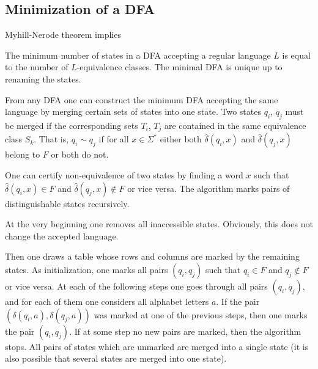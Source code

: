 \begin{page}

\subsection{Minimization of a DFA}
Myhill-Nerode theorem implies


\end{page}

\begin{page}

\begin{cor}
The minimum number of states in a DFA accepting a regular language $L$ is equal to the number of $L$-equivalence classes.
The minimal DFA is unique up to renaming the states.
\end{cor}

\end{page}

\begin{page}



From any DFA one can construct the minimum DFA accepting the same language by merging certain sets of states into one state.
Two states $q_i$, $q_j$ must be merged if the corresponding sets $T_i$, $T_j$ are contained in the same equivalence class $S_k$.
That is, $q_i \sim q_j$ if for all $x \in \Sigma^*$ either both $\widehat{\delta}(q_i, x)$ and $\widehat{\delta}(q_j, x)$ belong to $F$ or both do not.

One can certify non-equivalence of two states by finding a word $x$ such that $\widehat{\delta}(q_i, x) \in F$ and $\widehat{\delta}(q_j, x) \notin F$
or vice versa.
The algorithm marks pairs of distinguishable states recursively.

At the very beginning one removes all inaccessible states.
Obviously, this does not change the accepted language.

Then one draws a table whose rows and columns are marked by the remaining states.
As initialization, one marks all pairs $(q_i,q_j)$ such that $q_i \in F$ and $q_j \notin F$ or vice versa.
At each of the following steps one goes through all pairs $(q_i,q_j)$, and for each of them one considers all alphabet letters $a$.
If the pair $(\delta(q_i,a), \delta(q_j,a))$ was marked at one of the previous steps, then one marks the pair $(q_i, q_j)$.
If at some step no new pairs are marked, then the algorithm stops.
All pairs of states which are unmarked are merged into a single state
(it is also possible that several states are merged into one state).


\end{page}

